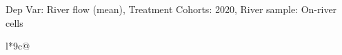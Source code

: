 \begin{table}[H]
\captionlistentry[table]{}
\label{table:beaver_hydrometry_DVflow_mean_SCg3}
\tiny %
Dep Var: River flow (mean), Treatment Cohorts: 2020, River sample: On-river cells \\
\begin{threeparttable}
\begin{tabulary}{\textwidth}{l*{9}{c}@{}}
\toprule \toprule
\noalign{\smallskip}
\noalign{\smallskip}
\midrule \bottomrule
\end{tabulary}
\medskip
\end{threeparttable}
\end{table}
